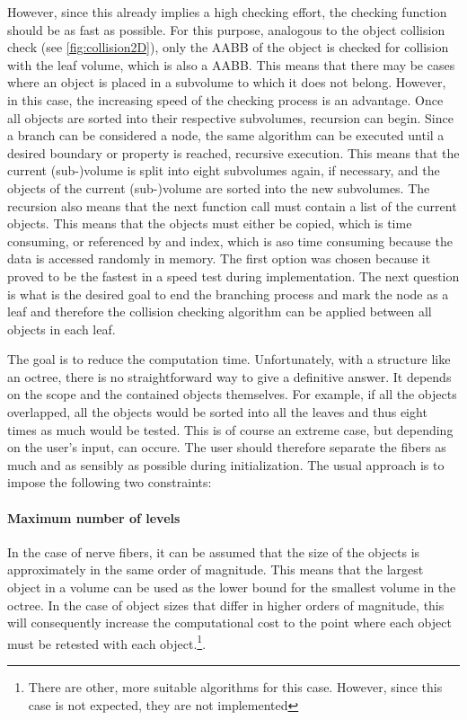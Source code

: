 However, since this already implies a high checking effort, the checking function should be as fast as possible.
For this purpose, analogous to the object collision check (see \cref{fig:collision2D}), only the \ac{AABB} of the object is checked for collision with the leaf volume, which is also a \ac{AABB}.
This means that there may be cases where an object is placed in a subvolume to which it does not belong.
However, in this case, the increasing speed of the checking process is an advantage.
Once all objects are sorted into their respective subvolumes, recursion can begin.
Since a branch can be considered a node, the same algorithm can be executed until a desired boundary or property is reached, \ie{} recursive execution.
This means that the current (sub-)volume is split into eight subvolumes again, if necessary, and the objects of the current (sub-)volume are sorted into the new subvolumes.
The recursion also means that the next function call must contain a list of the current objects.
This means that the objects must either be copied, which is time consuming, or referenced by \eg{} and index, which is aso time consuming because the data is accessed randomly in memory.
The first option was chosen because it proved to be the fastest in a speed test during implementation.
The next question is what is the desired goal to end the branching process and mark the node as a leaf and therefore the collision checking algorithm can be applied between all objects in each leaf.
\par
%
The goal is to reduce the computation time.
Unfortunately, with a structure like an octree, there is no straightforward way to give a definitive answer.
It depends on the scope and the contained objects themselves.
For example, if all the objects overlapped, all the objects would be sorted into all the leaves and thus eight times as much would be tested.
This is of course an extreme case, but depending on the user's input, can occure.
The user should therefore separate the fibers as much and as sensibly as possible during initialization.
The usual approach is to impose the following two constraints:
%
\paragraph{Maximum number of levels}
In the case of nerve fibers, it can be assumed that the size of the objects is approximately in the same order of magnitude.
This means that the largest object in a volume can be used as the lower bound for the smallest volume in the octree.
In the case of object sizes that differ in higher orders of magnitude, this will consequently increase the computational cost to the point where each object must be retested with each object.\footnote{There are other, more suitable algorithms for this case. However, since this case is not expected, they are not implemented}.
%
